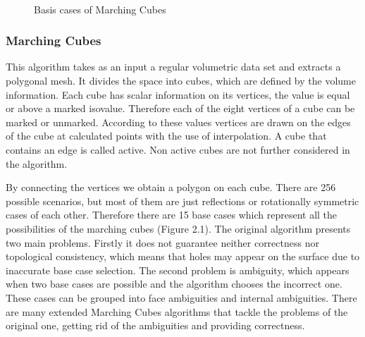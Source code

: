 \begin{figure}
\centering
   \\
   \caption{Basis cases of Marching Cubes}
\end{figure}

\subsubsection{Marching Cubes} 

This algorithm takes as an input a regular volumetric data set and extracts a polygonal mesh. It
divides the space into cubes, which are defined by the volume information. Each cube has scalar
information on its vertices, the value is equal or above a marked isovalue. Therefore each of the
eight vertices of a cube can be marked or unmarked. According to these values vertices are drawn
on the edges of the cube at calculated points with the use of interpolation. A cube that contains
an edge is called active. Non active cubes are not further considered in the algorithm.

By connecting the vertices we obtain a polygon on each cube. There are 256 possible scenarios,
but most of them are just reflections or rotationally symmetric cases of each other. Therefore
there are 15 base cases which represent all the possibilities of the marching cubes (Figure 2.1). 
The original algorithm presents two main problems. Firstly it does not guarantee neither
correctness nor topological consistency, which means that holes may appear on the surface due
to inaccurate base case selection. The second problem is ambiguity, which appears when two
base cases are possible and the algorithm chooses the incorrect one. These cases can be grouped
into face ambiguities and internal ambiguities. There are many extended Marching Cubes
algorithms that tackle the problems of the original one, getting rid of the ambiguities and
providing correctness.

